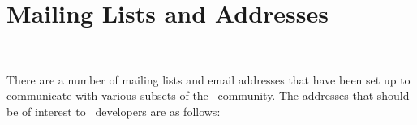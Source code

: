 
\chapter{Mailing Lists and Addresses}
\label{chap:addresses}
 \\

There are a number of mailing lists and email addresses that have been set 
up to communicate with various subsets of the \cgal\ community.  The 
addresses that should be of interest to \cgal\ developers are as follows:

